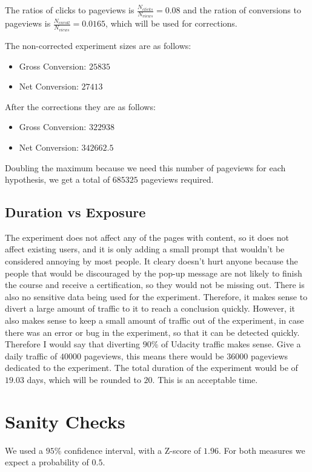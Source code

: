 \documentclass[12pt,a4paper]{article}
\begin{document}
The ratios of clicks to pageviews is $\frac{N_{clicks}}{N_{views}} = 0.08$ and the
ration of conversions to pageviews is $\frac{N_{enroll}}{N_{views}} = 0.0165$,
which will be used for corrections.

The non-corrected experiment sizes are as follows:
\begin{itemize}
\item Gross Conversion: $25835$
\item Net Conversion: $27413$
\end{itemize}

After the corrections they are as follows:
\begin{itemize}
\item Gross Conversion: $322938$
\item Net Conversion: $342662.5$
\end{itemize}

Doubling the maximum because we need this number of pageviews for each
hypothesis, we get a total of $685325$ pageviews required.

\subsection{Duration vs Exposure}
The experiment does not
affect any of the pages with content, so it does not affect existing users, and
it is only adding a small prompt that wouldn't be considered annoying by most
people. It cleary doesn't hurt anyone because the people that would be
discouraged by the pop-up message are not likely to finish the course and
receive a certification, so they would not be missing out. There is also no
sensitive data being used for the experiment.
Therefore, it makes sense to divert a large amount of traffic to it to reach a
conclusion quickly. However, it also makes sense to keep a small amount of
traffic out of the experiment, in case there was an error or bug in the
experiment, so that it can be detected quickly.  Therefore I would say that
diverting $90$\% of Udacity traffic makes sense. Give a daily traffic of $40000$
pageviews, this means there would be $36000$ pageviews dedicated to the
experiment. The total duration of the experiment would be of $19.03$ days, which
will be rounded to $20$. This is an acceptable time.

\section{Sanity Checks}
We used a $95$\% confidence interval, with a Z-score of $1.96$. For both
measures we expect a probability of $0.5$.
\end{document}
